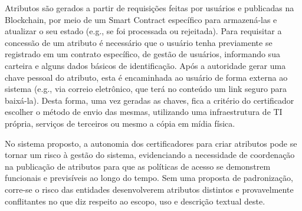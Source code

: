 \documentclass[a4paper,11pt]{article}
\begin{document}

Atributos são gerados a partir de requisições feitas por usuários e publicadas na Blockchain, por meio de um Smart Contract específico para armazená-las e atualizar o seu estado (e.g., se foi processada ou rejeitada).
Para requisitar a concessão de um atributo é necessário que o usuário tenha previamente se registrado em um contrato específico, de gestão de usuários, informando sua carteira e alguns dados básicos de identificação.
Após a autoridade gerar uma chave pessoal do atributo, esta é encaminhada ao usuário de forma externa ao sistema (e.g., via correio eletrônico, que terá no conteúdo um link seguro para baixá-la). %
Desta forma, uma vez geradas as chaves, fica a critério do certificador escolher o método de envio das mesmas, utilizando uma infraestrutura de TI própria, serviços de terceiros ou mesmo a cópia em mídia física.


No sistema proposto, a autonomia dos certificadores para criar atributos pode se tornar um risco à gestão do sistema, evidenciando a necessidade de coordenação na publicação de atributos para que as políticas de acesso se demonstrem funcionais e previsíveis ao longo do tempo. %
Sem uma proposta de padronização, corre-se o risco das entidades desenvolverem atributos distintos e provavelmente conflitantes no que diz respeito ao escopo, uso e descrição textual deste.
\end{document}
